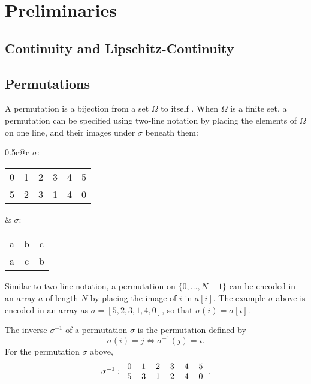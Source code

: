 \documentclass{llncs}
\begin{document}
\section{Preliminaries}

\subsection{Continuity and Lipschitz-Continuity}


\subsection{Permutations}
\label{perms}

A permutation is a bijection from a set \(\Omega\) to itself \cite{dummitfoote}.  When \(\Omega\) is a finite set, a permutation can be specified using two-line notation by placing the elements of \(\Omega\) on one line, and their images under \(\sigma\) beneath them:

\begin{center}
\begin{tabular*}{0.5\textwidth}{c@{\extracolsep{\fill}}c}
\(\sigma\):
\begin{tabular}{cccccc}
0 & 1 & 2 & 3 & 4 & 5\\
5 & 2 & 3 & 1 & 4 & 0
\end{tabular}
&
\(\sigma\):
\begin{tabular}{ccc}
a & b & c\\
a & c & b
\end{tabular}
\end{tabular*}
\end{center}

Similar to two-line notation, a permutation on \(\{0, \dotsc, N-1\}\) can be encoded in an array \(a\) of length \(N\) by placing the image of \(i\) in \(a[i]\).  The example \(\sigma\) above is encoded in an array as \(\sigma = [5, 2, 3, 1, 4, 0]\), so that \(\sigma(i) = \sigma[i]\).

The inverse \(\sigma^{-1}\) of a permutation \(\sigma\) is the permutation defined by
\[\sigma(i) = j \Longleftrightarrow \sigma^{-1}(j) = i.\]
For the permutation \(\sigma\) above,
\[\sigma^{-1}:\begin{tabular}{cccccc}
0 & 1 & 2 & 3 & 4 & 5\\
5 & 3 & 1 & 2 & 4 & 0
\end{tabular}.\]
\end{document}
